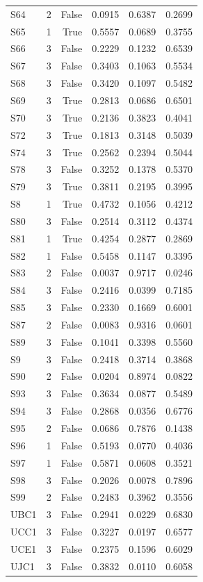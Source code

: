 \begin{longtable}{lrrrrr}
  S64 & 2 & False & 0.0915 & 0.6387 & 0.2699 \\
  S65 & 1 & True & 0.5557 & 0.0689 & 0.3755 \\
  S66 & 3 & False & 0.2229 & 0.1232 & 0.6539 \\
  S67 & 3 & False & 0.3403 & 0.1063 & 0.5534 \\
  S68 & 3 & False & 0.3420 & 0.1097 & 0.5482 \\
  S69 & 3 & True & 0.2813 & 0.0686 & 0.6501 \\
  S70 & 3 & True & 0.2136 & 0.3823 & 0.4041 \\
  S72 & 3 & True & 0.1813 & 0.3148 & 0.5039 \\
  S74 & 3 & True & 0.2562 & 0.2394 & 0.5044 \\
  S78 & 3 & False & 0.3252 & 0.1378 & 0.5370 \\
  S79 & 3 & True & 0.3811 & 0.2195 & 0.3995 \\
  S8 & 1 & True & 0.4732 & 0.1056 & 0.4212 \\
  S80 & 3 & False & 0.2514 & 0.3112 & 0.4374 \\
  S81 & 1 & True & 0.4254 & 0.2877 & 0.2869 \\
  S82 & 1 & False & 0.5458 & 0.1147 & 0.3395 \\
  S83 & 2 & False & 0.0037 & 0.9717 & 0.0246 \\
  S84 & 3 & False & 0.2416 & 0.0399 & 0.7185 \\
  S85 & 3 & False & 0.2330 & 0.1669 & 0.6001 \\
  S87 & 2 & False & 0.0083 & 0.9316 & 0.0601 \\
  S89 & 3 & False & 0.1041 & 0.3398 & 0.5560 \\
  S9 & 3 & False & 0.2418 & 0.3714 & 0.3868 \\
  S90 & 2 & False & 0.0204 & 0.8974 & 0.0822 \\
  S93 & 3 & False & 0.3634 & 0.0877 & 0.5489 \\
  S94 & 3 & False & 0.2868 & 0.0356 & 0.6776 \\
  S95 & 2 & False & 0.0686 & 0.7876 & 0.1438 \\
  S96 & 1 & False & 0.5193 & 0.0770 & 0.4036 \\
  S97 & 1 & False & 0.5871 & 0.0608 & 0.3521 \\
  S98 & 3 & False & 0.2026 & 0.0078 & 0.7896 \\
  S99 & 2 & False & 0.2483 & 0.3962 & 0.3556 \\
  UBC1 & 3 & False & 0.2941 & 0.0229 & 0.6830 \\
  UCC1 & 3 & False & 0.3227 & 0.0197 & 0.6577 \\
  UCE1 & 3 & False & 0.2375 & 0.1596 & 0.6029 \\
  UJC1 & 3 & False & 0.3832 & 0.0110 & 0.6058 \\
\end{longtable}
